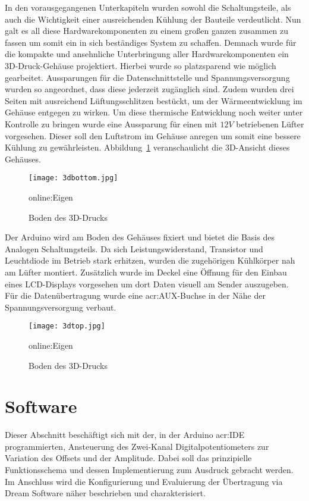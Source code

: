 In den vorausgegangenen Unterkapiteln wurden sowohl die Schaltungsteile, als auch die Wichtigkeit einer ausreichenden Kühlung der Bauteile verdeutlicht. Nun galt es all diese Hardwarekomponenten zu einem großen ganzen zusammen zu fassen um somit ein in sich beständiges System zu schaffen. Demnach wurde für die kompakte und ansehnliche Unterbringung aller Hardwarekomponenten ein 3D-Druck-Gehäuse projektiert. Hierbei wurde so platzsparend wie möglich gearbeitet. Aussparungen für die Datenschnittstelle und Spannungsversorgung wurden so angeordnet, dass diese jederzeit zugänglich sind. Zudem wurden drei Seiten mit ausreichend Lüftungsschlitzen bestückt, um der Wärmeentwicklung im Gehäuse entgegen zu wirken. Um diese thermische Entwicklung noch weiter unter Kontrolle zu bringen wurde eine Aussparung für einen mit $12V$ betriebenen Lüfter vorgesehen. Dieser soll den Luftstrom im Gehäuse anregen um somit eine bessere Kühlung zu gewährleisten. Abbildung~\ref{fig:3dbottom} veranschaulicht die 3D-Ansicht dieses Gehäuses.

\begin{figure}[H]
	\centering
	\texttt{[image: 3dbottom.jpg]}
	\caption[Boden des 3D-Drucks]{Boden des 3D-Drucks} \gls{online:Eigen}
	\label{fig:3dbottom}
\end{figure}

Der Arduino wird am Boden des Gehäuses fixiert und bietet die Basis des Analogen Schaltungsteils.
Da sich Leistungswiderstand, Transistor und Leuchtdiode im Betrieb stark erhitzen, wurden die zugehörigen Kühlkörper nah am Lüfter montiert. Zusätzlich wurde im Deckel eine Öffnung für den Einbau eines LCD-Displays vorgesehen um dort Daten visuell am Sender auszugeben. Für die Datenübertragung wurde eine \gls{acr:AUX}-Buchse in der Nähe der Spannungsversorgung verbaut.

\begin{figure}[H]
	\centering
	\texttt{[image: 3dtop.jpg]}
	\caption[Boden des 3D-Drucks]{Boden des 3D-Drucks} \gls{online:Eigen}
	\label{fig:3dtop}
\end{figure}
\newpage
\section{Software}
\label{sec:Software}

Dieser Abschnitt beschäftigt sich mit der, in der Arduino \gls{acr:IDE} programmierten, Ansteuerung des Zwei-Kanal Digitalpotentiometers zur Variation des Offsets und der Amplitude. Dabei soll das prinzipielle Funktionsschema und dessen Implementierung zum Ausdruck gebracht werden. Im Anschluss wird die Konfigurierung und Evaluierung der Übertragung via Dream Software näher beschrieben und charakterisiert.

